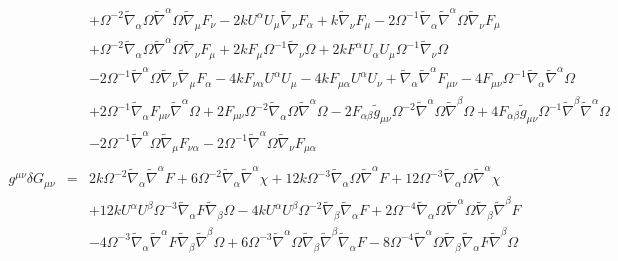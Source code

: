 \documentclass[10pt,letterpaper]{article}
\numberwithin{equation}{section}
\begin{document}
\begin{eqnarray}
&& + \Omega^{-2} \tilde{\nabla}_{\alpha }\Omega \tilde{\nabla}^{\alpha }\Omega \tilde{\nabla}_{\mu }F_{\nu } - 2 k U^{\alpha } U_{\mu } \tilde{\nabla}_{\nu }F_{\alpha } + k \tilde{\nabla}_{\nu }F_{\mu } - 2 \Omega^{-1} \tilde{\nabla}_{\alpha }\tilde{\nabla}^{\alpha }\Omega \tilde{\nabla}_{\nu }F_{\mu } \nonumber \\ 
&& + \Omega^{-2} \tilde{\nabla}_{\alpha }\Omega \tilde{\nabla}^{\alpha }\Omega \tilde{\nabla}_{\nu }F_{\mu } + 2 k F_{\mu } \Omega^{-1} \tilde{\nabla}_{\nu }\Omega + 2 k F^{\alpha } U_{\alpha } U_{\mu } \Omega^{-1} \tilde{\nabla}_{\nu }\Omega \nonumber \\ 
&& - 2 \Omega^{-1} \tilde{\nabla}^{\alpha }\Omega \tilde{\nabla}_{\nu }\tilde{\nabla}_{\mu }F_{\alpha }-4 k F_{\nu \alpha } U^{\alpha } U_{\mu } - 4 k F_{\mu \alpha } U^{\alpha } U_{\nu } + \tilde{\nabla}_{\alpha }\tilde{\nabla}^{\alpha }F_{\mu \nu } - 4 F_{\mu \nu } \Omega^{-1} \tilde{\nabla}_{\alpha }\tilde{\nabla}^{\alpha }\Omega \nonumber \\ 
&& + 2 \Omega^{-1} \tilde{\nabla}_{\alpha }F_{\mu \nu } \tilde{\nabla}^{\alpha }\Omega + 2 F_{\mu \nu } \Omega^{-2} \tilde{\nabla}_{\alpha }\Omega \tilde{\nabla}^{\alpha }\Omega - 2 F_{\alpha \beta } \tilde{g}_{\mu \nu } \Omega^{-2} \tilde{\nabla}^{\alpha }\Omega \tilde{\nabla}^{\beta }\Omega + 4 F_{\alpha \beta } \tilde{g}_{\mu \nu } \Omega^{-1} \tilde{\nabla}^{\beta }\tilde{\nabla}^{\alpha }\Omega \nonumber \\ 
&& - 2 \Omega^{-1} \tilde{\nabla}^{\alpha }\Omega \tilde{\nabla}_{\mu }F_{\nu \alpha } - 2 \Omega^{-1} \tilde{\nabla}^{\alpha }\Omega \tilde{\nabla}_{\nu }F_{\mu \alpha }
\\  \nonumber\\ 
g^{\mu\nu}\delta G_{\mu\nu}&=& 2 k \Omega^{-2} \tilde{\nabla}_{\alpha }\tilde{\nabla}^{\alpha }F + 6 \Omega^{-2} \tilde{\nabla}_{\alpha }\tilde{\nabla}^{\alpha }\chi + 12 k \Omega^{-3} \tilde{\nabla}_{\alpha }\Omega \tilde{\nabla}^{\alpha }F + 12 \Omega^{-3} \tilde{\nabla}_{\alpha }\Omega \tilde{\nabla}^{\alpha }\chi \nonumber \\ 
&& + 12 k U^{\alpha } U^{\beta } \Omega^{-3} \tilde{\nabla}_{\alpha }F \tilde{\nabla}_{\beta }\Omega - 4 k U^{\alpha } U^{\beta } \Omega^{-2} \tilde{\nabla}_{\beta }\tilde{\nabla}_{\alpha }F + 2 \Omega^{-4} \tilde{\nabla}_{\alpha }\Omega \tilde{\nabla}^{\alpha }\Omega \tilde{\nabla}_{\beta }\tilde{\nabla}^{\beta }F \nonumber \\ 
&& - 4 \Omega^{-3} \tilde{\nabla}_{\alpha }\tilde{\nabla}^{\alpha }F \tilde{\nabla}_{\beta }\tilde{\nabla}^{\beta }\Omega + 6 \Omega^{-3} \tilde{\nabla}^{\alpha }\Omega \tilde{\nabla}_{\beta }\tilde{\nabla}^{\beta }\tilde{\nabla}_{\alpha }F - 8 \Omega^{-4} \tilde{\nabla}^{\alpha }\Omega \tilde{\nabla}_{\beta }\tilde{\nabla}_{\alpha }F \tilde{\nabla}^{\beta }\Omega \nonumber \\ 

\end{eqnarray}
\end{document}
